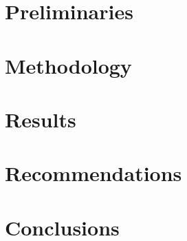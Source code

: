 \documentclass[a4paper,10pt,twoside]{report}
\begin{document}

\chapter{Preliminaries}\label{chapter:preliminaries}



% 


\chapter{Methodology}\label{chapter:methodology}


\chapter{Results}\label{chapter:results}



\chapter{Recommendations}\label{chapter:recommendations}


\chapter{Conclusions}\label{chapter:conclusions}



%
% 




\appendix
{}


\end{document}
